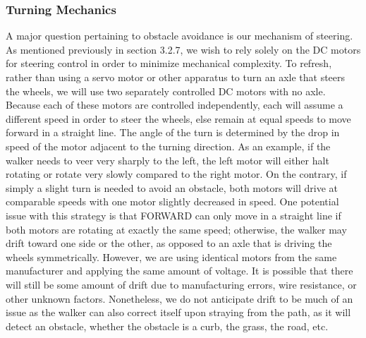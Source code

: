 \subsubsection{Turning Mechanics}
\noindent A major question pertaining to obstacle avoidance is our mechanism of steering. As mentioned previously in section 3.2.7, we wish to rely solely on the DC motors for steering control in order to minimize mechanical complexity.  To refresh, rather than using a servo motor or other apparatus to turn an axle that steers the wheels, we will use two separately controlled DC motors with no axle. Because each of these motors are controlled independently, each will assume a different speed in order to steer the wheels, else remain at equal speeds to move forward in a straight line. The angle of the turn is determined by the drop in speed of the motor adjacent to the turning direction. As an example, if the walker needs to veer very sharply to the left, the left motor will either halt rotating or rotate very slowly compared to the right motor. On the contrary, if simply a slight turn is needed to avoid an obstacle, both motors will drive at comparable speeds with one motor slightly decreased in speed. One potential issue with this strategy is that FORWARD can only move in a straight line if both motors are rotating at exactly the same speed; otherwise, the walker may drift toward one side or the other, as opposed to an axle that is driving the wheels symmetrically. However, we are using identical motors from the same manufacturer and applying the same amount of voltage. It is possible that there will still be some amount of drift due to manufacturing errors, wire resistance, or other unknown factors. Nonetheless, we do not anticipate drift to be much of an issue as the walker can also correct itself upon straying from the path, as it will detect an obstacle, whether the obstacle is a curb, the grass, the road, etc.

